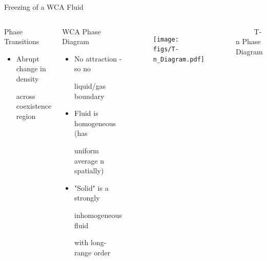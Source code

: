 \documentclass{beamer}
\begin{document}
			    
				

\begin{frame}{Freezing of a WCA Fluid}
	\begin{columns}[t]
	    \vspace{-1em}
		\begin{block}{Phase Transitions}
		     \begin{itemize}
				\item Abrupt change in density
				
				across coexistence region
			 \end{itemize}		
		\end{block} 
		\begin{block}{WCA Phase Diagram}
		     \begin{itemize}
				\item No attraction	- so no
				
				liquid/gas boundary
				\item Fluid is homogeneous (has
				
				uniform average n spatially) 
				\item "Solid" is a strongly 
				
				inhomogeneous fluid 
				
				with long-range order		
			  \end{itemize}				 
		\end{block}			       
	    \vspace{-2em}
		 \begin{figure}
            \centering
            \texttt{[image: figs/T-n\_Diagram.pdf]}
          \end{figure}
          \vspace{-1em}
         $~~~~~~~~~~$ T-n Phase Diagram  
       
	\end{columns}
    \vspace{+1em}
\end{frame}
\end{document}
